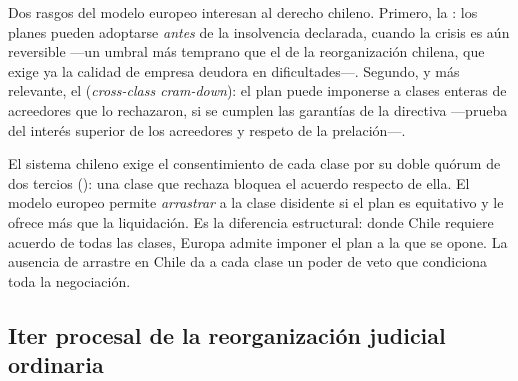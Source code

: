 Dos rasgos del modelo europeo interesan al derecho chileno. Primero, la
: los planes pueden adoptarse \emph{antes} de la
insolvencia declarada, cuando la crisis es aún reversible ---un umbral más temprano que el de la
reorganización chilena, que exige ya la calidad de empresa deudora en dificultades---. Segundo, y
más relevante, el  (\emph{cross-class cram-down}): el plan
puede imponerse a clases enteras de acreedores que lo rechazaron, si se cumplen las garantías de
la directiva ---prueba del interés superior de los acreedores y respeto de la prelación---.

\begin{foco}
El sistema chileno exige el consentimiento de cada clase por su doble quórum de dos tercios
(): una clase que rechaza bloquea el acuerdo respecto de ella. El modelo europeo permite
\emph{arrastrar} a la clase disidente si el plan es equitativo y le ofrece más que la
liquidación. Es la diferencia estructural: donde Chile requiere acuerdo de todas las clases,
Europa admite imponer el plan a la que se opone. La ausencia de arrastre en Chile da a cada
clase un poder de veto que condiciona toda la negociación.
\end{foco}

\bloquePractico

\subsection{Iter procesal de la reorganización judicial ordinaria}

